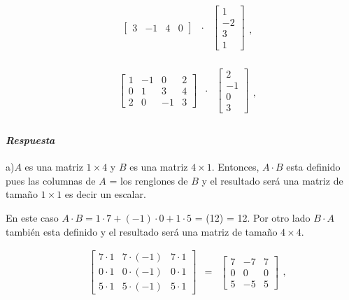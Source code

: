 \documentclass[
]{article}
\begin{document}
\begin{equation*}
  \begin{array}{cccc}
   & \begin{bmatrix} 3 & -1 & 4 & 0  \end{bmatrix} &\cdot &  
     \begin{bmatrix} 1 \\-2 \\ 3\\ 1 \end{bmatrix}  \\  
  \end{array},
\end{equation*}

\begin{equation*}
  \begin{array}{cccc}
   & \begin{bmatrix} 
        1 & -1 & 0 & 2 \\
        0 &  1 & 3 & 4 \\
        2 &  0 &-1 & 3
      \end{bmatrix} &\cdot &  
     \begin{bmatrix} 2 \\-1 \\ 0\\ 3 \end{bmatrix}  \\  
  \end{array},
\end{equation*}

\hypertarget{respuesta}{%
\paragraph{\texorpdfstring{\emph{Respuesta}}{Respuesta}}\label{respuesta}}

a)\(A\) es una matriz \(1\times 4\) y \(B\) es una matriz \(4\times 1\).
Entonces, \(A\cdot B\) esta definido pues las columnas de \(A\) = los
renglones de \(B\) y el resultado será una matriz de tamaño
\(1\times 1\) es decir un escalar.

En este caso \(A\cdot B = 1\cdot 7 + (-1) \cdot 0 + 1\cdot 5\) = (12) =
12. Por otro lado \(B\cdot A\) también esta definido y el resultado será
una matriz de tamaño \(4\times 4\).

\begin{equation*}
  \begin{array}{cccc}
   & \begin{bmatrix} 
        7\cdot 1 & 7\cdot(-1) & 7\cdot 1  \\
        0\cdot 1 & 0\cdot(-1) & 0\cdot 1  \\
        5\cdot 1 & 5\cdot(-1) & 5\cdot 1 
      \end{bmatrix} & = & 
      \begin{bmatrix} 
        7 & -7 & 7  \\
        0 & 0  & 0  \\
        5 & -5 & 5 
      \end{bmatrix}
  \end{array} ,
\end{equation*}
\end{document}
